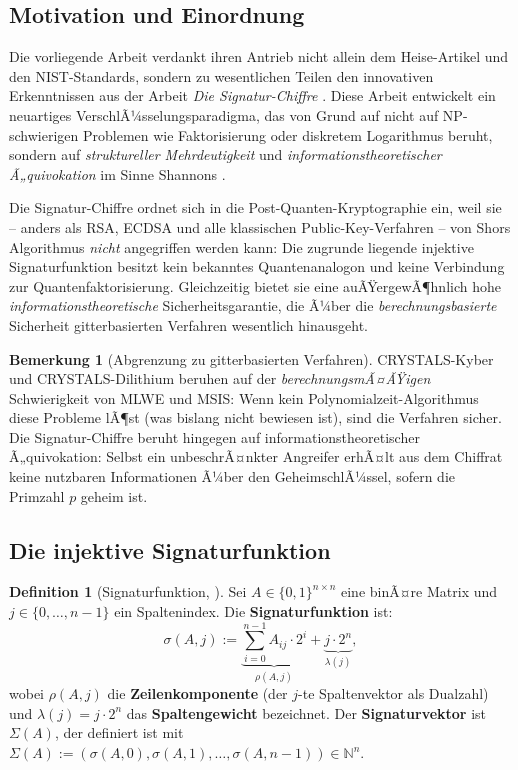 ﻿\documentclass[a4paper,12pt]{article}
\theoremstyle{definition}
\newtheorem{definition}{Definition}[section]
\newtheorem{bemerkung}{Bemerkung}[section]
\begin{document}
\subsection{Motivation und Einordnung}

Die vorliegende Arbeit verdankt ihren Antrieb nicht allein dem Heise-Artikel
\cite{Hei26} und den NIST-Standards, sondern zu wesentlichen Teilen den
innovativen Erkenntnissen aus der Arbeit \emph{Die Signatur-Chiffre}
\cite{Epp26b}. Diese Arbeit entwickelt ein neuartiges VerschlÃ¼sselungsparadigma,
das von Grund auf nicht auf NP-schwierigen Problemen wie Faktorisierung oder
diskretem Logarithmus beruht, sondern auf \emph{struktureller Mehrdeutigkeit}
und \emph{informationstheoretischer Ã„quivokation} im Sinne Shannons \cite{Sha49}.

Die Signatur-Chiffre ordnet sich in die Post-Quanten-Kryptographie ein,
weil sie -- anders als RSA, ECDSA und alle klassischen Public-Key-Verfahren --
von Shors Algorithmus \emph{nicht} angegriffen werden kann:
Die zugrunde liegende injektive Signaturfunktion besitzt kein bekanntes
Quantenanalogon und keine Verbindung zur Quantenfaktorisierung.
Gleichzeitig bietet sie eine auÃŸergewÃ¶hnlich hohe \emph{informationstheoretische}
Sicherheitsgarantie, die Ã¼ber die \emph{berechnungsbasierte} Sicherheit
gitterbasierten Verfahren wesentlich hinausgeht.

\begin{bemerkung}[Abgrenzung zu gitterbasierten Verfahren]
CRYSTALS-Kyber und CRYSTALS-Dilithium beruhen auf der \emph{berechnungsmÃ¤ÃŸigen}
Schwierigkeit von MLWE und MSIS: Wenn kein Polynomialzeit-Algorithmus diese
Probleme lÃ¶st (was bislang nicht bewiesen ist), sind die Verfahren sicher.
Die Signatur-Chiffre beruht hingegen auf informationstheoretischer Ã„quivokation:
Selbst ein unbeschrÃ¤nkter Angreifer erhÃ¤lt aus dem Chiffrat keine nutzbaren
Informationen Ã¼ber den GeheimschlÃ¼ssel, sofern die Primzahl $p$ geheim ist.
\end{bemerkung}

\subsection{Die injektive Signaturfunktion}

\begin{definition}[Signaturfunktion, \cite{Epp26b}]
\label{def:pqc-sigma}
Sei $A \in \{0,1\}^{n \times n}$ eine binÃ¤re Matrix und $j \in \{0,\ldots,n-1\}$
ein Spaltenindex. Die \textbf{Signaturfunktion} ist:
\[
  \sigma(A, j) := \underbrace{\sum_{i=0}^{n-1} A_{ij} \cdot 2^i}_{\displaystyle\rho(A,j)}
  + \underbrace{j \cdot 2^n}_{\displaystyle\lambda(j)},
\]
wobei $\rho(A,j)$ die \textbf{Zeilenkomponente} (der $j$-te Spaltenvektor als
Dualzahl) und $\lambda(j) = j \cdot 2^n$ das \textbf{Spaltengewicht} bezeichnet.
Der \textbf{Signaturvektor} ist $\Sigma(A)$, der definiert ist mit
$\Sigma(A) := (\sigma(A,0), \sigma(A,1), \ldots, \sigma(A,n-1)) \in \mathbb{N}^n$.
\end{definition}
\end{document}
